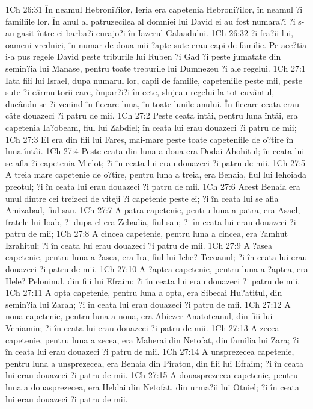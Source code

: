 1Ch 26:31  În neamul Hebroni?ilor, Ieria era capetenia Hebroni?ilor, în neamul ?i familiile lor. În anul al patruzecilea al domniei lui David ei au fost numara?i ?i s-au gasit între ei barba?i curajo?i în Iazerul Galaadului.
1Ch 26:32  ?i fra?ii lui, oameni vrednici, în numar de doua mii ?apte sute erau capi de familie. Pe ace?tia i-a pus regele David peste triburile lui Ruben ?i Gad ?i peste jumatate din semin?ia lui Manase, pentru toate treburile lui Dumnezeu ?i ale regelui.
1Ch 27:1  Iata fiii lui Israel, dupa numarul lor, capii de familie, capeteniile peste mii, peste sute ?i cârmuitorii care, împar?i?i în cete, slujeau regelui la tot cuvântul, ducându-se ?i venind în fiecare luna, în toate lunile anului. În fiecare ceata erau câte douazeci ?i patru de mii.
1Ch 27:2  Peste ceata întâi, pentru luna întâi, era capetenia Ia?obeam, fiul lui Zabdiel; în ceata lui erau douazeci ?i patru de mii;
1Ch 27:3  El era din fiii lui Fares, mai-mare peste toate capeteniile de o?tire în luna întâi.
1Ch 27:4  Peste ceata din luna a doua era Dodai Ahohitul; în ceata lui se afla ?i capetenia Miclot; ?i în ceata lui erau douazeci ?i patru de mii.
1Ch 27:5  A treia mare capetenie de o?tire, pentru luna a treia, era Benaia, fiul lui Iehoiada preotul; ?i în ceata lui erau douazeci ?i patru de mii.
1Ch 27:6  Acest Benaia era unul dintre cei treizeci de viteji ?i capetenie peste ei; ?i în ceata lui se afla Amizabad, fiul sau.
1Ch 27:7  A patra capetenie, pentru luna a patra, era Asael, fratele lui Ioab, ?i dupa el era Zebadia, fiul sau; ?i în ceata lui erau douazeci ?i patru de mii;
1Ch 27:8  A cincea capetenie, pentru luna a cincea, era ?amhut Izrahitul; ?i în ceata lui erau douazeci ?i patru de mii.
1Ch 27:9  A ?asea capetenie, pentru luna a ?asea, era Ira, fiul lui Iche? Tecoanul; ?i în ceata lui erau douazeci ?i patru de mii.
1Ch 27:10  A ?aptea capetenie, pentru luna a ?aptea, era Hele? Peloninul, din fiii lui Efraim; ?i în ceata lui erau douazeci ?i patru de mii.
1Ch 27:11  A opta capetenie, pentru luna a opta, era Sibecai Hu?atitul, din semin?ia lui Zarah; ?i în ceata lui erau douazeci ?i patru de mii.
1Ch 27:12  A noua capetenie, pentru luna a noua, era Abiezer Anatoteanul, din fiii lui Veniamin; ?i în ceata lui erau douazeci ?i patru de mii.
1Ch 27:13  A zecea capetenie, pentru luna a zecea, era Maherai din Netofat, din familia lui Zara; ?i în ceata lui erau douazeci ?i patru de mii.
1Ch 27:14  A unsprezecea capetenie, pentru luna a unsprezecea, era Benaia din Piraton, din fiii lui Efraim; ?i în ceata lui erau douazeci ?i patru de mii.
1Ch 27:15  A douasprezecea capetenie, pentru luna a douasprezecea, era Heldai din Netofat, din urma?ii lui Otniel; ?i în ceata lui erau douazeci ?i patru de mii.
